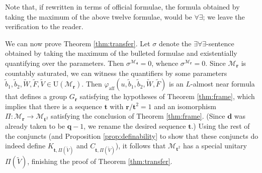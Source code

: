 \documentclass[12pt]{amsart}
\numberwithin{equation}{section}
\theoremstyle{definition}
\def\M{\mathcal{M}}
\def \M{\mathcal{M}}
\begin{document}
Note that, if rewritten in terms of official formulae, the formula obtained by taking the maximum of the above twelve formulae, would be $\forall\exists$; we leave the verification to the reader.

We can now prove Theorem \ref{thm:transfer}.  Let $\sigma$ denote the $\exists\forall\exists$-sentence obtained by taking the maximum of the bulleted formulae and existentially quantifying over the parameters.  Then $\sigma^{\M_{\mathbf{4}}}=0$, whence $\sigma^{\M_{\mathbf{r}}}=0$.  Since $\M_\mathbf{r}$ is countably saturated, we can witness the quantifiers by some parameters $\tilde{b}_1,\tilde{b}_2,\tilde{W},\tilde{F},\tilde{V}\in \mathrm{U}(\M_{\mathbf{r}})$.  Then $\varphi_{\operatorname{aff}}(u,\tilde{b}_1,\tilde{b}_2,\tilde{W},\tilde{F})$ is an $L$-almost near formula that defines a group $G_{\mathbf{r}}$ satisfying the hypotheses of Theorem \ref{thm:frame}, which implies that there is a sequence $\mathbf{t}$ with $\mathbf{r}/\mathbf{t}^2=1$ and an isomorphism $\Pi:\M_{\mathbf{r}}\to \M_{\mathbf{t}^2}$ satisfying the conclusion of Theorem \ref{thm:frame}.  (Since $\mathbf{d}$ was already taken to be $\mathbf{q}-1$, we rename the desired sequence $\mathbf{t}$.)  Using the rest of the conjuncts (and Proposition \ref{prop:definability} to show that these conjuncts do indeed define $K_{\mathbf{t},\Pi(\tilde{V})}$ and $C_{\mathbf{t},\Pi(\tilde{V})}$), it follows that $\M_{\mathbf{t}^2}$ has a special unitary $\Pi(\tilde{V})$, finishing the proof of Theorem \ref{thm:transfer}.
\end{document}
